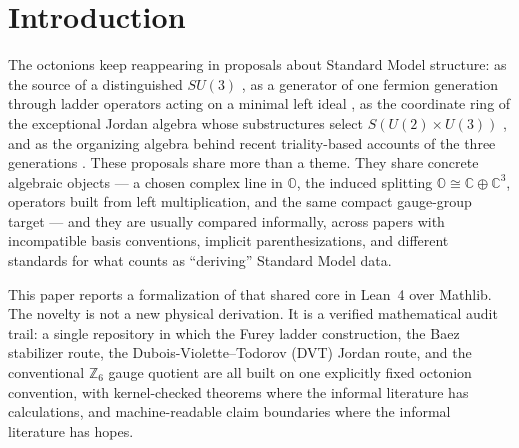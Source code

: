 \documentclass[11pt]{article}
\newcommand{\C}{\mathbb{C}}
\newcommand{\OO}{\mathbb{O}}
\begin{document}
\section{Introduction}

The octonions keep reappearing in proposals about Standard Model
structure: as the source of a distinguished $SU(3)$
\cite{Baez2021,BaezOctonions}, as a generator of one fermion generation
through ladder operators acting on a minimal left ideal
\cite{Furey2016,Furey2018}, as the coordinate ring of the exceptional
Jordan algebra whose substructures select
$S(U(2)\times U(3))$ \cite{DVT2018}, and as the organizing algebra behind
recent triality-based accounts of the three generations
\cite{FureyHughes2025}.  These proposals share more than a theme.  They
share concrete algebraic objects --- a chosen complex line in $\OO$, the
induced splitting $\OO \cong \C \oplus \C^3$, operators built from left
multiplication, and the same compact gauge-group target --- and they are
usually compared informally, across papers with incompatible basis
conventions, implicit parenthesizations, and different standards for what
counts as ``deriving'' Standard Model data.

This paper reports a formalization of that shared core in Lean~4 over
Mathlib.  The novelty is not a new physical derivation.  It is a verified
mathematical audit trail: a single repository in which the Furey ladder
construction, the Baez stabilizer route, the
Dubois-Violette--Todorov (DVT) Jordan route, and the conventional
$\mathbb{Z}_6$ gauge quotient are all built on one explicitly fixed
octonion convention, with kernel-checked theorems where the informal
literature has calculations, and machine-readable claim boundaries where
the informal literature has hopes.
\end{document}
